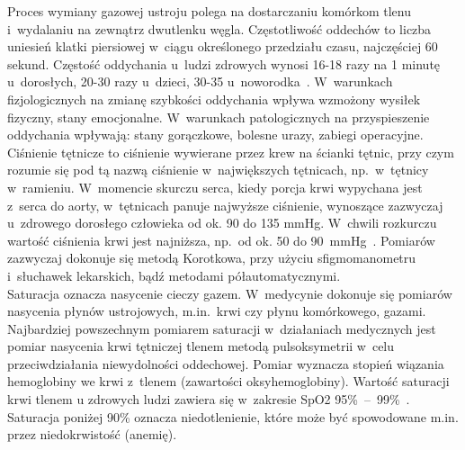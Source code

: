 Proces wymiany gazowej ustroju polega na dostarczaniu komórkom tlenu i~wydalaniu na zewnątrz dwutlenku węgla. Częstotliwość oddechów to liczba 
uniesień klatki piersiowej w~ciągu określonego przedziału czasu, najczęściej 60 sekund.
Częstość oddychania u~ludzi zdrowych wynosi 16-18 razy na 1 minutę u~dorosłych, 20-30 razy u~dzieci, 30-35 u~noworodka~\cite{SzGa11}. W~warunkach 
fizjologicznych na zmianę szybkości oddychania wpływa wzmożony wysiłek fizyczny, stany emocjonalne. W~warunkach patologicznych na przyspieszenie 
oddychania wpływają: stany gorączkowe, bolesne urazy, zabiegi operacyjne.\\

Ciśnienie tętnicze to ciśnienie wywierane przez krew na ścianki tętnic, przy czym rozumie się pod tą nazwą ciśnienie w~największych tętnicach, 
np.~w~tętnicy w~ramieniu. W~momencie skurczu serca, kiedy porcja krwi wypychana jest z~serca do aorty, w~tętnicach panuje najwyższe ciśnienie, 
wynoszące zazwyczaj u~zdrowego dorosłego człowieka od ok. 90 do 135 mmHg. W~chwili rozkurczu wartość ciśnienia krwi jest najniższa, np.~od ok. 50 
do 90~mmHg~\cite{SzGa11}. Pomiarów zazwyczaj dokonuje się metodą Korotkowa, przy użyciu sfigmomanometru i~słuchawek lekarskich, bądź metodami półautomatycznymi.\\

Saturacja oznacza nasycenie cieczy gazem. W~medycynie dokonuje się pomiarów nasycenia płynów ustrojowych, m.in.~krwi czy płynu komórkowego, gazami.
Najbardziej powszechnym pomiarem saturacji w~działaniach medycznych jest pomiar nasycenia krwi tętniczej tlenem metodą pulsoksymetrii w~celu 
przeciwdziałania niewydolności oddechowej. Pomiar wyznacza stopień wiązania hemoglobiny we krwi z~tlenem (zawartości oksyhemoglobiny). Wartość 
saturacji krwi tlenem u zdrowych ludzi zawiera się w~zakresie SpO2 95\%~–~99\%~\cite{SzGa11}. Saturacja poniżej 90\% oznacza niedotlenienie, 
które może być spowodowane m.in. przez niedokrwistość (anemię).\\


